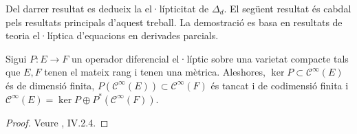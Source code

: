 Del darrer resultat es dedueix la el·lípticitat de $\Delta_{d}$.\newline
El següent resultat és cabdal pels resultats principals d'aquest treball. La demostració es basa en resultats de teoria el·líptica d'equacions en derivades parcials.
\begin{teorema}\label{1.11}
    Sigui $P:E\rightarrow F$ un operador diferencial el·líptic sobre una varietat compacte tals que $E,F$ tenen el mateix rang i tenen una mètrica. Aleshores, $\ker{P}\subset\mathscr{C}^{\infty}(E)$ és de dimensió finita, $P(\mathcal{C}^{\infty}(E))\subset\mathcal{C}^{\infty}(F)$ és tancat i de codimensió finita i $\mathcal{C}^{\infty}(E)=\ker{P}\oplus P^{*}(\mathcal{C}^{\infty}(F))$.
    \begin{proof}
        Veure \cite{demailly1997complex}, IV.2.4.
    \end{proof}
\end{teorema}
